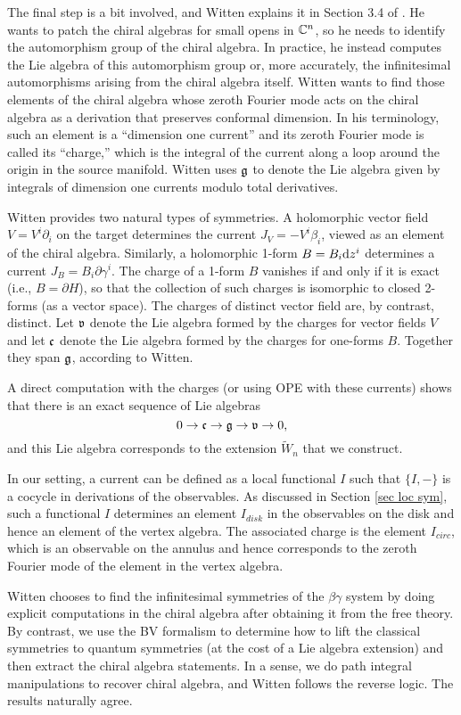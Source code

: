 The final step is a bit involved, and Witten explains it in Section 3.4 of \cite{WittenCDO}.
He wants to patch the chiral algebras for small opens in $\mathbb C^n$,
so he needs to identify the automorphism group of the chiral algebra.
In practice, he instead computes the Lie algebra of this automorphism group 
or, more accurately, the infinitesimal automorphisms arising from the chiral algebra itself.
Witten wants to find those elements of the chiral algebra whose zeroth Fourier mode 
acts on the chiral algebra as a derivation that preserves conformal dimension.
In his terminology, such an element is a ``dimension one current'' and 
its zeroth Fourier mode is called its ``charge,'' 
which is the integral of the current along a loop around the origin in the source manifold.
Witten uses $\mathfrak g$ to denote the Lie algebra given by integrals of dimension one currents modulo total derivatives.

Witten provides two natural types of symmetries.
A holomorphic vector field $V = V^i \partial_i$ on the target determines the current $J_V = -V^i \beta_i$,
viewed as an element of the chiral algebra.
Similarly, a holomorphic 1-form $B = B_i {\rm d} z^i$ determines a current $J_B = B_i \partial \gamma^i$.
The charge of a 1-form $B$ vanishes if and only if it is exact (i.e., $B = \partial H$),
so that the collection of such charges is isomorphic to closed 2-forms (as a vector space).
The charges of distinct vector field are, by contrast, distinct.
Let $\frak{v}$ denote the Lie algebra formed by the charges for vector fields $V$ and 
let $\frak{c}$ denote the Lie algebra formed by the charges for one-forms $B$.
Together they span $\mathfrak g$, according to Witten.

A direct computation with the charges (or using OPE with these currents) shows that there is an exact sequence of Lie algebras
\[
0 \to \frak{c} \to \mathfrak g \to \frak{v} \to 0,
\]
and this Lie algebra corresponds to the extension $\widetilde{W}_n$ that we construct.

In our setting, a current can be defined as a local functional $I$ such that $\{I,-\}$ is a cocycle in derivations of the observables.
As discussed in Section \ref{sec loc sym}, such a functional $I$ determines an element $I_{disk}$ in the observables on the disk and hence an element of the vertex algebra.
The associated charge is the element $I_{circ}$, which is an observable on the annulus and hence corresponds to the zeroth Fourier mode of the element in the vertex algebra.

Witten chooses to find the infinitesimal symmetries of the $\beta\gamma$ system 
by doing explicit computations in the chiral algebra after obtaining it from the free theory.
By contrast, we use the BV formalism to determine how to lift the classical symmetries to quantum symmetries
(at the cost of a Lie algebra extension)
and then extract the chiral algebra statements.
In a sense, we do path integral manipulations to recover chiral algebra, 
and Witten follows the reverse logic.
The results naturally agree.

